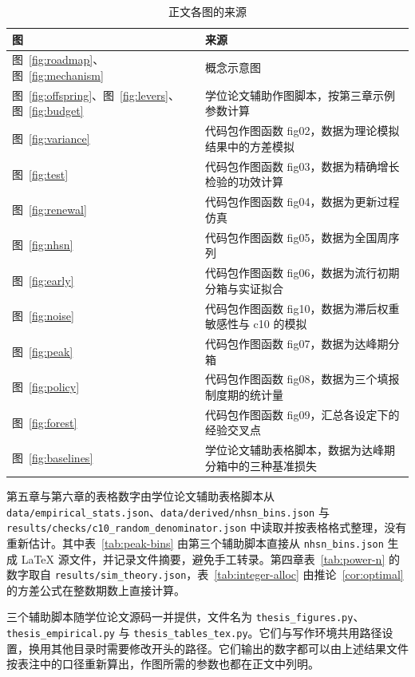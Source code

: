\begin{table}[!htbp]
  \centering
  \caption{正文各图的来源}
  \label{tab:repro-figs}
  \small
  \begin{tabularx}{\textwidth}{@{}lX@{}}
    \toprule
    图 & 来源 \\
    \midrule
    图~\ref{fig:roadmap}、图~\ref{fig:mechanism} & 概念示意图 \\
    图~\ref{fig:offspring}、图~\ref{fig:levers}、图~\ref{fig:budget} & 学位论文辅助作图脚本，按第三章示例参数计算 \\
    图~\ref{fig:variance} & 代码包作图函数 fig02，数据为理论模拟结果中的方差模拟 \\
    图~\ref{fig:test} & 代码包作图函数 fig03，数据为精确增长检验的功效计算 \\
    图~\ref{fig:renewal} & 代码包作图函数 fig04，数据为更新过程仿真 \\
    图~\ref{fig:nhsn} & 代码包作图函数 fig05，数据为全国周序列 \\
    图~\ref{fig:early} & 代码包作图函数 fig06，数据为流行初期分箱与实证拟合 \\
    图~\ref{fig:noise} & 代码包作图函数 fig10，数据为滞后权重敏感性与 c10 的模拟 \\
    图~\ref{fig:peak} & 代码包作图函数 fig07，数据为达峰期分箱 \\
    图~\ref{fig:policy} & 代码包作图函数 fig08，数据为三个填报制度期的统计量 \\
    图~\ref{fig:forest} & 代码包作图函数 fig09，汇总各设定下的经验交叉点 \\
    图~\ref{fig:baselines} & 学位论文辅助表格脚本，数据为达峰期分箱中的三种基准损失 \\
    \bottomrule
  \end{tabularx}
\end{table}

第五章与第六章的表格数字由学位论文辅助表格脚本从 \nolinkurl{data/empirical_stats.json}、\nolinkurl{data/derived/nhsn_bins.json} 与 \nolinkurl{results/checks/c10_random_denominator.json} 中读取并按表格格式整理，没有重新估计。其中表~\ref{tab:peak-bins} 由第三个辅助脚本直接从 \nolinkurl{nhsn_bins.json} 生成 LaTeX 源文件，并记录文件摘要，避免手工转录。第四章表~\ref{tab:power-n} 的数字取自 \nolinkurl{results/sim_theory.json}，表~\ref{tab:integer-alloc} 由推论~\ref{cor:optimal} 的方差公式在整数期数上直接计算。

三个辅助脚本随学位论文源码一并提供，文件名为 \nolinkurl{thesis_figures.py}、\nolinkurl{thesis_empirical.py} 与 \nolinkurl{thesis_tables_tex.py}。它们与写作环境共用路径设置，换用其他目录时需要修改开头的路径。它们输出的数字都可以由上述结果文件按表注中的口径重新算出，作图所需的参数也都在正文中列明。

